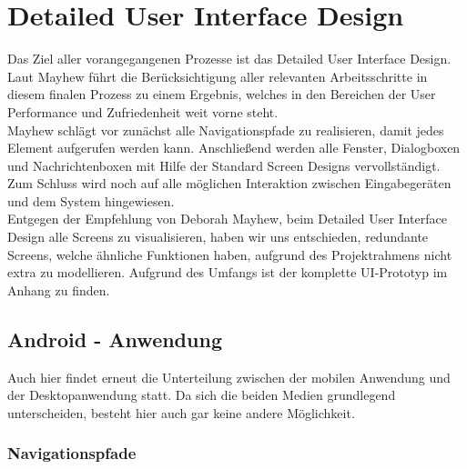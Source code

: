 \chapter{Detailed User Interface Design}
Das Ziel aller vorangegangenen Prozesse ist das Detailed User Interface Design. Laut Mayhew führt die Berücksichtigung aller relevanten Arbeitsschritte in diesem finalen Prozess zu einem Ergebnis, welches in den Bereichen der User Performance und Zufriedenheit weit vorne steht. \cite[325]{Mayhew:UEL}\\

Mayhew schlägt vor zunächst alle Navigationspfade zu realisieren, damit jedes Element aufgerufen werden kann. Anschließend werden alle Fenster, Dialogboxen und Nachrichtenboxen mit Hilfe der Standard Screen Designs vervollständigt. Zum Schluss wird noch auf alle möglichen Interaktion zwischen Eingabegeräten und dem System hingewiesen. \\

Entgegen der Empfehlung von Deborah Mayhew, beim Detailed User Interface Design alle Screens zu visualisieren, haben wir uns entschieden, redundante Screens, welche ähnliche Funktionen haben, aufgrund des Projektrahmens nicht extra zu modellieren.
Aufgrund des Umfangs ist der komplette UI-Prototyp im Anhang zu finden.\\

\section{Android - Anwendung}
Auch hier findet erneut die Unterteilung zwischen der mobilen Anwendung und der Desktopanwendung statt. Da sich die beiden Medien grundlegend unterscheiden, besteht hier auch gar keine andere Möglichkeit.
\subsection{Navigationspfade}

